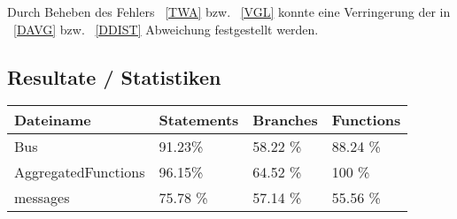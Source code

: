 \documentclass[qualitaetssicherung.tex]{subfiles}
\begin{document}
	Durch Beheben des Fehlers ~\ref{TWA} bzw. ~\ref{VGL} konnte eine Verringerung der in ~\ref{DAVG} bzw. ~\ref{DDIST} Abweichung festgestellt werden.

\subsection*{Resultate / Statistiken}
\begin{center}
    \begin{tabular}{| l | l | l | l |}
    \hline
    Dateiname & Statements & Branches & Functions \\ \hline
    	Bus & 91.23\% & 58.22 \% & 88.24 \% \\ \hline
		AggregatedFunctions & 96.15\% & 64.52 \% & 100 \% \\ \hline
		messages & 75.78 \% & 57.14 \% & 55.56 \% \\
    \hline
    \end{tabular}
\end{center}
\end{document}
